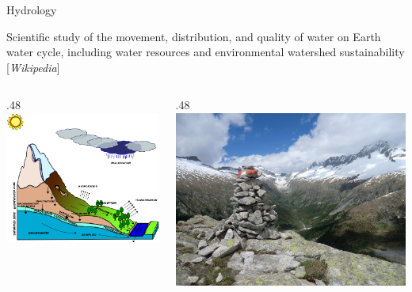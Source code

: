 \documentclass[ignorenonframetext,]{beamer}
\def\begincols{\begin{columns}}
\def\begincol{\begin{column}}
\def\endcol{\end{column}}
\def\endcols{\end{columns}}
\begin{document}
\begin{frame}{Hydrology}

Scientific study of the movement, distribution, and quality of water on
Earth water cycle, including water resources and environmental watershed
sustainability {[}\emph{Wikipedia}{]} \begincols
\begincol{.48\textwidth}
\includegraphics[width=1.00000\textwidth]{resources/images/geotop_landscape.png}\\
\endcol
\begincol{.48\textwidth}
\includegraphics[width=1.00000\textwidth]{resources/images/valdifumo.jpg}\\
\endcol
\endcols

\end{frame}
\end{document}
